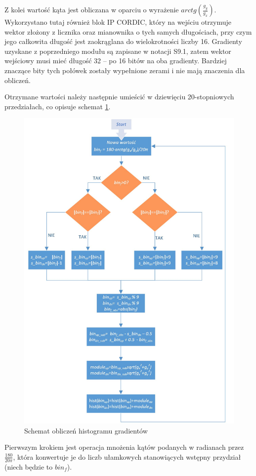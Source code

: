 Z kolei wartość kąta jest obliczana w oparciu o wyrażenie $arctg(\frac{g_y}{g_x})$. Wykorzystano tutaj również blok IP CORDIC, który na wejściu otrzymuje wektor złożony z licznika oraz mianownika o tych samych długościach, przy czym jego całkowita długość jest zaokrąglana do wielokrotności liczby 16. Gradienty uzyskane z poprzedniego modułu są zapisane w notacji S9.1, zatem wektor wejściowy musi mieć długość 32 -- po 16 bitów na oba gradienty.
Bardziej znaczące bity tych połówek zostały wypełnione zerami i nie mają znaczenia dla obliczeń.

Otrzymane wartości należy następnie umieścić w dziewięciu 20-stopniowych przedziałach, co opisuje schemat \ref{fig:hog_gradient}. 
\begin{figure}[!ht]
	\centering
	\includegraphics[width=12cm]{4_HOG_gradients.jpg}
	\caption{Schemat obliczeń histogramu gradientów}
	\label{fig:hog_gradient}
\end{figure}

Pierwszym krokiem jest operacja mnożenia kątów podanych w radianach przez $\frac{180}{20\pi}$, która konwertuje je do liczb ułamkowych stanowiących wstępny przydział (niech będzie to $bin_f$).

